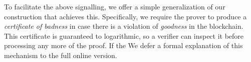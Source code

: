  To facilitate the above signalling, we offer a simple generalization of our
construction that achieves this.
Specifically, we require the prover to produce a
\textit{certificate of badness} in case there is a violation of
\textit{goodness} in the blockchain.
This certificate is guaranteed to logarithmic, so a verifier can inspect it before processing any more of the proof. If the 
We defer a formal explanation of this mechanism to the full online version.
